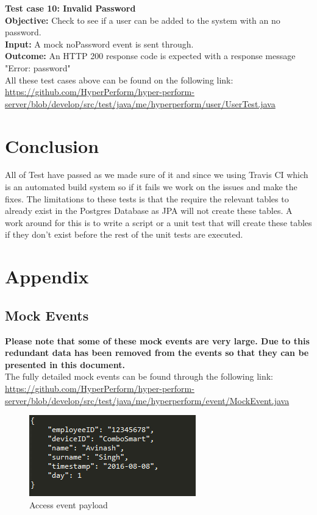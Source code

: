 \documentclass[11pt,a4paper]{article}
\begin{document}
\textbf{Test case 10: Invalid Password} \\
\textbf{Objective: } Check to see if a user can be added to the system with an no password. \\
\textbf{Input: }  A mock noPassword event is sent through.\\
\textbf{Outcome: } An HTTP 200 response code is expected with a response message "Error: password" \\

All these test cases above can be found on the following link: \url{https://github.com/HyperPerform/hyper-perform-server/blob/develop/src/test/java/me/hyperperform/user/UserTest.java}




\section{Conclusion}
All of Test have passed as we made sure of it and since we using Travis CI which is an automated build system so if it fails we work on the issues and make the fixes. The limitations to these tests is that the require the relevant tables to already exist in the Postgres Database as JPA will not create these tables. A work around for this is to write a script or a unit test that will create these tables if they don't exist before the rest of the unit tests are executed.

\newpage

\section{Appendix}

\subsection{Mock Events}
\textbf{Please note that some of these mock events are very large. Due to this redundant data has been removed from the events so that they can be presented in this document.} \\

The fully detailed mock events can be found through the following link: \url{https://github.com/HyperPerform/hyper-perform-server/blob/develop/src/test/java/me/hyperperform/event/MockEvent.java} \\

\begin{figure}[H]
	\centering
	\includegraphics[scale=1.0]{../Images/accessEvent}
	\caption{Access event payload}
\end{figure}
 
\end{document}
